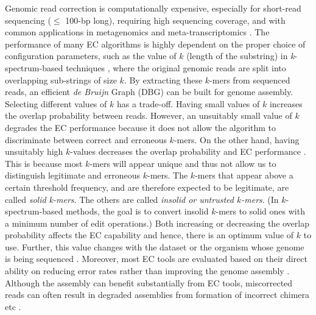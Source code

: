 Genomic read correction is computationally expensive, especially for short-read sequencing ($\leq$ 100-bp long), requiring high sequencing coverage, and with common applications in metagenomics and meta-transcriptomics \cite{meyer2017mg,chaterji2017federation}. The performance of many EC algorithms is highly dependent on the proper choice of configuration parameters, such as the value of $k$ (length of the substring) in \textit{k}-spectrum-based techniques \cite{mahadik2017scalable}, where the original genomic reads are split into overlapping sub-strings of size $k$. By extracting these $k$-mers from sequenced reads, an efficient \textit{de Bruijn} Graph (DBG) \cite{compeau2011apply} can be built for genome assembly. Selecting different values of $k$ has a trade-off. Having small values of $k$ increases the overlap probability between reads. However, an unsuitably small value of $k$ degrades the EC performance because it does not allow the algorithm to discriminate between correct and erroneous $k$-mers. On the other hand, having unsuitably high $k$-values decreases the overlap probability and EC performance \cite{sameith2016iterative}. This is because most $k$-mers will appear unique and thus not allow us to distinguish legitimate and erroneous $k$-mers. 
The $k$-mers that appear above a certain threshold frequency, and are therefore expected to be legitimate, are called \textit{solid k-mers}. The others are called \textit{insolid or untrusted $k$-mers}. (In $k$-spectrum-based methods, the goal is to convert insolid $k$-mers to solid ones with a minimum number of edit operations.) Both increasing or decreasing the overlap probability affects the EC capability and hence, there is an optimum value of $k$ to use. Further, this value changes with the dataset or the organism whose genome is being sequenced \cite{heydari2017evaluation}. Moreover, most EC tools are evaluated based on their direct ability on reducing error rates rather than improving the genome assembly \cite{heydari2017evaluation}. Although the assembly can benefit substantially from EC tools, miscorrected reads can often result in degraded assemblies from formation of incorrect chimera etc \cite{heydari2017evaluation}.
